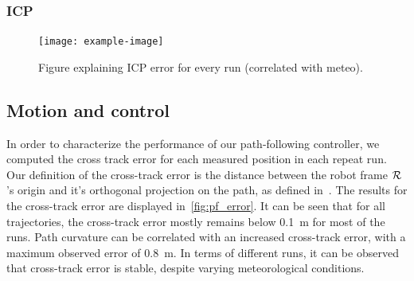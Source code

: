 \subsubsection{ICP}
\label{sec:ICP}

\lightlipsum[1]

\begin{figure} [htpb]
	\centering
	\texttt{[image: example-image]}
	\caption{Figure explaining ICP error for every run (correlated with meteo).}
	\label{fig:icp_error}
\end{figure}



\subsection{Motion and control}
\label{sec:res_motion}

In order to characterize the performance of our path-following controller, we computed the cross track error for each measured position in each repeat run.
Our definition of the cross-track error is the distance between the robot frame $\mathcal{R}$'s origin and it's orthogonal projection on the path, as defined in~\citep{Mondoloni2005}.
The results for the cross-track error are displayed in~\autoref{fig:pf_error}.
It can be seen that for all trajectories, the cross-track error mostly remains below \SI{0.1}{m} for most of the runs.
Path curvature can be correlated with an increased cross-track error, with a maximum observed error of \SI{0.8}{m}.
In terms of different runs, it can be observed that cross-track error is stable, despite varying meteorological conditions. 

